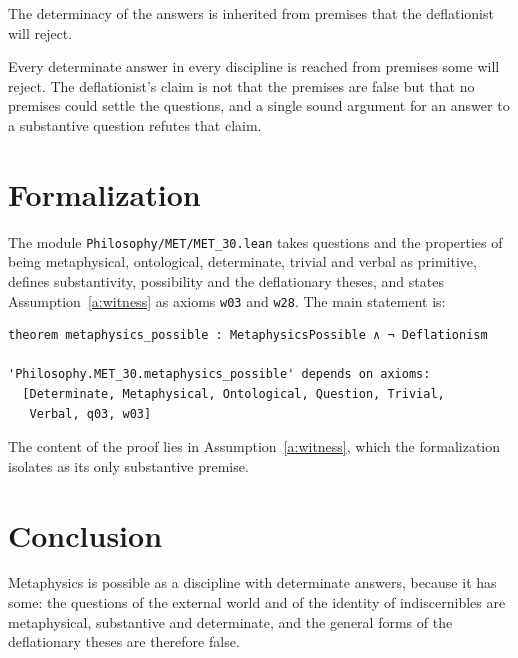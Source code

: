 \documentclass{situationist-preprint}
\begin{document}
\begin{objection}
The determinacy of the answers is inherited from premises that the deflationist will reject.
\end{objection}

\begin{reply}
Every determinate answer in every discipline is reached from premises some will reject. The deflationist's claim is not that the premises are false but that no premises could settle the questions, and a single sound argument for an answer to a substantive question refutes that claim.
\end{reply}


\section{Formalization}

The module \nolinkurl{Philosophy/MET/MET_30.lean} takes questions and the properties of being metaphysical, ontological, determinate, trivial and verbal as primitive, defines substantivity, possibility and the deflationary theses, and states Assumption~\ref{a:witness} as axioms \texttt{w03} and \texttt{w28}. The main statement is:

\begin{lstlisting}
theorem metaphysics_possible : MetaphysicsPossible ∧ ¬ Deflationism

'Philosophy.MET_30.metaphysics_possible' depends on axioms:
  [Determinate, Metaphysical, Ontological, Question, Trivial,
   Verbal, q03, w03]
\end{lstlisting}

The content of the proof lies in Assumption~\ref{a:witness}, which the formalization isolates as its only substantive premise.

\section{Conclusion}

Metaphysics is possible as a discipline with determinate answers, because it has some: the questions of the external world and of the identity of indiscernibles are metaphysical, substantive and determinate, and the general forms of the deflationary theses are therefore false.
\end{document}
